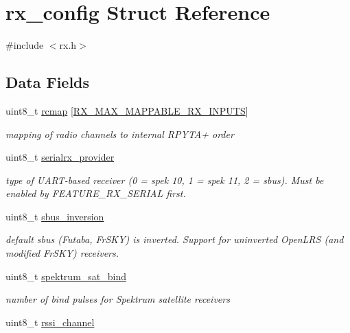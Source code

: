 \hypertarget{structrx__config}{\section{rx\+\_\+config Struct Reference}
\label{structrx__config}
}


{\ttfamily \#include $<$rx.\+h$>$}

\subsection*{Data Fields}
\begin{DoxyCompactItemize}
\item 
uint8\+\_\+t \hyperlink{structrx__config_a466e723fab37f8cd2903d5ff8ee6e751}{rcmap} \mbox{[}\hyperlink{config_2rx_8h_a2ef9ea7cd22f2ca36356809255c981ba}{R\+X\+\_\+\+M\+A\+X\+\_\+\+M\+A\+P\+P\+A\+B\+L\+E\+\_\+\+R\+X\+\_\+\+I\+N\+P\+U\+T\+S}\mbox{]}
\begin{DoxyCompactList}\small\item\em mapping of radio channels to internal R\+P\+Y\+T\+A+ order \end{DoxyCompactList}\item 
uint8\+\_\+t \hyperlink{structrx__config_a7b07d2f4be0c5a71dc3c9245a7b8a619}{serialrx\+\_\+provider}
\begin{DoxyCompactList}\small\item\em type of U\+A\+R\+T-\/based receiver (0 = spek 10, 1 = spek 11, 2 = sbus). Must be enabled by F\+E\+A\+T\+U\+R\+E\+\_\+\+R\+X\+\_\+\+S\+E\+R\+I\+A\+L first. \end{DoxyCompactList}\item 
uint8\+\_\+t \hyperlink{structrx__config_af35bf9196e92a85c8fe7f37b98a03ae5}{sbus\+\_\+inversion}
\begin{DoxyCompactList}\small\item\em default sbus (Futaba, Fr\+S\+K\+Y) is inverted. Support for uninverted Open\+L\+R\+S (and modified Fr\+S\+K\+Y) receivers. \end{DoxyCompactList}\item 
uint8\+\_\+t \hyperlink{structrx__config_a08514dca1ab82db4e499f2e558744388}{spektrum\+\_\+sat\+\_\+bind}
\begin{DoxyCompactList}\small\item\em number of bind pulses for Spektrum satellite receivers \end{DoxyCompactList}\item 
uint8\+\_\+t \hyperlink{structrx__config_a69cfd398b4b4da28a68e7d22725d164c}{rssi\+\_\+channel}

\end{DoxyCompactItemize}
